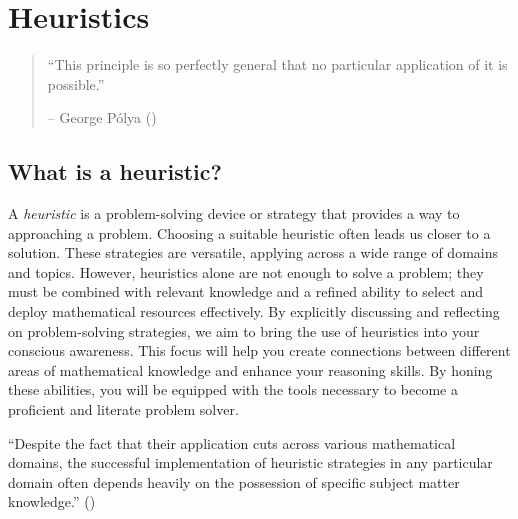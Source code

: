 \documentclass[
  a4paper,
  DIV=11,
  numbers=noendperiod,
  oneside]{scrreprt}
\begin{document}
\chapter{Heuristics}\label{sec-heuristics}

\begin{quote}
``This principle is so perfectly general that no particular application
of it is possible.''

-- George Pólya ()
\end{quote}

\section{What is a heuristic?}\label{what-is-a-heuristic}

A \emph{heuristic} is a problem-solving device or strategy that provides
a way to approaching a problem. Choosing a suitable heuristic often
leads us closer to a solution. These strategies are versatile, applying
across a wide range of domains and topics. However, heuristics alone are
not enough to solve a problem; they must be combined with relevant
knowledge and a refined ability to select and deploy mathematical
resources effectively. By explicitly discussing and reflecting on
problem-solving strategies, we aim to bring the use of heuristics into
your conscious awareness. This focus will help you create connections
between different areas of mathematical knowledge and enhance your
reasoning skills. By honing these abilities, you will be equipped with
the tools necessary to become a proficient and literate problem solver.

\begin{tcolorbox}[enhanced jigsaw, opacitybacktitle=0.6, colframe=quarto-callout-warning-color-frame, bottomrule=.15mm, coltitle=black, colback=white, title=\textcolor{quarto-callout-warning-color}{\faExclamationTriangle}\hspace{0.5em}{Heuristics will not replace shaky mastery of a subject!}, breakable, toptitle=1mm, arc=.35mm, left=2mm, opacityback=0, rightrule=.15mm, bottomtitle=1mm, colbacktitle=quarto-callout-warning-color!10!white, toprule=.15mm, leftrule=.75mm, titlerule=0mm]

``Despite the fact that their application cuts across various
mathematical domains, the successful implementation of heuristic
strategies in any particular domain often depends heavily on the
possession of specific subject matter knowledge.''
()

\end{tcolorbox}
\end{document}

